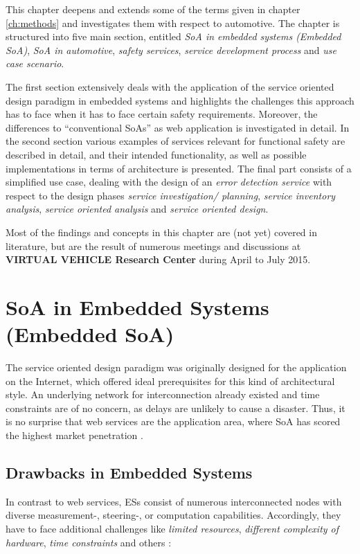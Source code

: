 \label{ch:results}
This chapter deepens and extends some of the terms given in chapter \ref{ch:methods} and investigates them with respect to automotive. The chapter is structured into five main section, entitled \emph{SoA in embedded systems (Embedded SoA)}, \emph{SoA in automotive}, \emph{safety services}, \emph{service development process} and \emph{use case scenario}. 

The first section extensively deals with the application of the service oriented design paradigm in embedded systems and highlights the challenges this approach has to face when it has to face certain safety requirements. Moreover, the differences to ``conventional SoAs'' as web application is investigated in detail. In the second section various examples of services relevant for functional safety are described in detail, and their intended functionality, as well as possible implementations in terms of architecture is presented. The final part consists of a simplified use case, dealing with the design of an \emph{error detection service} with respect to the design phases \emph{service investigation/ planning}, \emph{service inventory analysis}, \emph{service oriented analysis} and \emph{service oriented design}.

Most of the findings and concepts in this chapter are (not yet) covered in literature, but are the result of numerous meetings and discussions at \textbf{VIRTUAL VEHICLE Research Center} during April to July 2015.







\section{SoA in Embedded Systems (Embedded SoA)}
\label{sec:soa-in-embedded-systems}

The service oriented design paradigm was originally designed for the application on the Internet, which offered ideal prerequisites for this kind of architectural style. An underlying network for interconnection already existed and time constraints are of no concern, as delays are unlikely to cause a disaster. Thus, it is no surprise that web services are the application area, where SoA has scored the highest market penetration \cite{rodrigues2011} \cite{buckl}.


\subsection{Drawbacks in Embedded Systems}
In contrast to web services, ESs consist of numerous interconnected nodes with diverse measurement-, steering-, or computation capabilities. Accordingly, they have to face additional challenges like \emph{limited resources}, \emph{different complexity of hardware}, \emph{time constraints} and others \cite{scholz} \cite{sommer}: 

